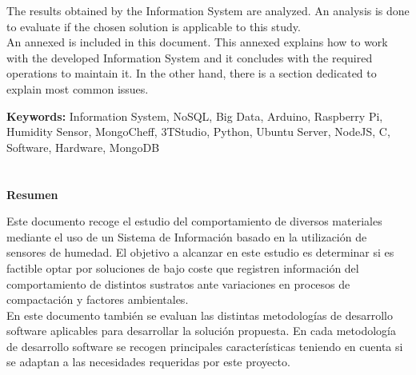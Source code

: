 The results obtained by the Information System are analyzed. An analysis is done to evaluate if the chosen solution is applicable to this study.\\

An annexed is included in this document. This annexed explains how to work with the developed Information System and it concludes with the required operations to maintain it. In the other hand, there is a section dedicated to explain most common issues.


\newpage
\noindent
{\bf Keywords:\newline}
Information System, NoSQL, Big Data, Arduino, Raspberry Pi, Humidity Sensor, MongoCheff, 3TStudio, Python, Ubuntu Server, NodeJS, C, Software, Hardware, MongoDB

\thispagestyle{empty}
\newpage

\chapter*{}
\begin{center}
\textbf{Resumen}
\end{center}

Este documento recoge el estudio del comportamiento de diversos materiales mediante el uso de un Sistema de Información basado en la utilización de sensores de humedad. El objetivo a alcanzar en este estudio es determinar si es factible optar por soluciones de bajo coste que registren información del comportamiento de distintos sustratos ante variaciones en procesos de compactación y factores ambientales.\\

En este documento también se evaluan las distintas metodologías de desarrollo software aplicables para desarrollar la solución propuesta. En cada metodología de desarrollo software se recogen principales características teniendo en cuenta si se adaptan a las necesidades requeridas por este proyecto.\\

